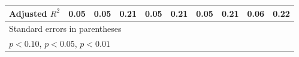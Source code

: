 \begin{table}[htbp]
\begin{tabular}{l*{9}{c}}
Adjusted \(R^{2}\)&     0.05         &     0.05         &     0.21         &     0.05         &     0.21         &     0.05         &     0.21         &     0.06         &     0.22         \\
\hline\hline
\multicolumn{10}{l}{\footnotesize Standard errors in parentheses}\\
\multicolumn{10}{l}{\footnotesize \sym{*} \(p<0.10\), \sym{**} \(p<0.05\), \sym{***} \(p<0.01\)}\\
\end{tabular}
\end{table}
